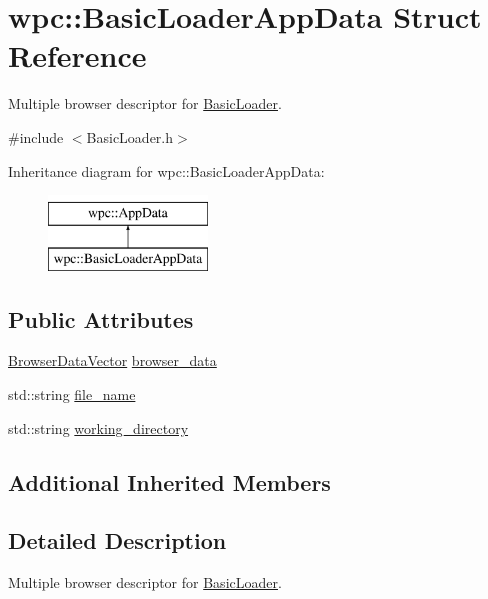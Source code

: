 \hypertarget{structwpc_1_1_basic_loader_app_data}{\section{wpc\-:\-:Basic\-Loader\-App\-Data Struct Reference}
\label{structwpc_1_1_basic_loader_app_data}
}


Multiple browser descriptor for \hyperlink{classwpc_1_1_basic_loader}{Basic\-Loader}.  




{\ttfamily \#include $<$Basic\-Loader.\-h$>$}

Inheritance diagram for wpc\-:\-:Basic\-Loader\-App\-Data\-:\begin{figure}[H]
\begin{center}
\leavevmode
\includegraphics[height=2.000000cm]{structwpc_1_1_basic_loader_app_data}
\end{center}
\end{figure}
\subsection*{Public Attributes}
\begin{DoxyCompactItemize}
\item 
\hyperlink{namespacewpc_a558cfa552932b524c346cce3b726ad61}{Browser\-Data\-Vector} \hyperlink{structwpc_1_1_basic_loader_app_data_acf149c4e47abbd1cfa328c34454d7f9d}{browser\-\_\-data}
\item 
std\-::string \hyperlink{structwpc_1_1_basic_loader_app_data_ae2d689df0e7b350df3a9ac5a56d595b8}{file\-\_\-name}
\item 
std\-::string \hyperlink{structwpc_1_1_basic_loader_app_data_addbe7c7423efac0a937ff257d20432ef}{working\-\_\-directory}
\end{DoxyCompactItemize}
\subsection*{Additional Inherited Members}


\subsection{Detailed Description}
Multiple browser descriptor for \hyperlink{classwpc_1_1_basic_loader}{Basic\-Loader}. 



